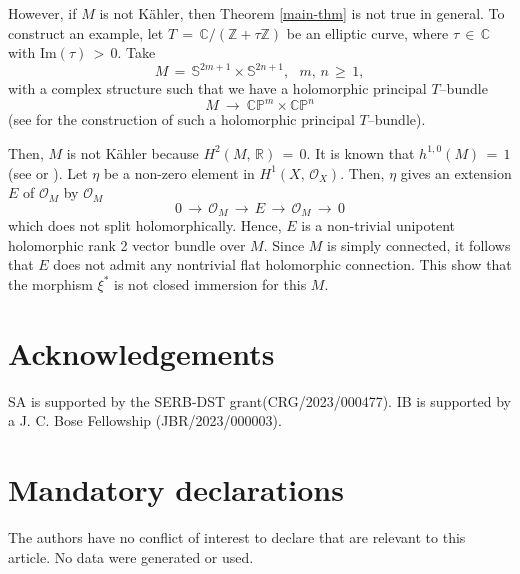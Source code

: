 \documentclass[12pt]{amsart}
\theoremstyle{definition}
\numberwithin{equation}{section}
\newcommand{\C}{\mathbb{C}}
\newcommand{\Z}{\mathbb{Z}}
\begin{document}
However, if $M$ is not K\"ahler, then Theorem \ref{main-thm} is not true in general. 
To construct an example, let $T \,=\, \C/(\Z + \tau\Z)$ be an elliptic curve,
where $\tau\,\in\,  \C$ with $\mathrm{Im}(\tau) \,>\, 0$. Take
$$M\, =\, \mathbb{S}^{2m+1}\times \mathbb{S}^{2n+1},\ \ \ m,\, n\, \geq\, 1,$$
with a complex structure such that we have a 
holomorphic principal $T$--bundle
$$M\ \longrightarrow\ \C\mathbb{P}^m \times \C\mathbb{P}^n$$
(see \cite{Ho} for the construction of such a holomorphic principal $T$--bundle).

Then, $M$ is not K\"ahler because $H^2(M,\, {\mathbb R})\,=\, 0$.
It is known that $h^{1, 0}(M) \,=\, 1$ (see \cite[p.~232]{Ho} or \cite{Bo}).
Let $\eta$ be a non-zero element in $H^1(X,\, \mathcal{O}_X)$. Then, $\eta$ gives an 
extension $E$ of ${\mathcal O}_M$ by ${\mathcal O}_M$
$$
0\,\longrightarrow\, \mathcal{O}_M \,\longrightarrow\, E \,\longrightarrow\, \mathcal{O}_M
\,\longrightarrow\, 0
$$
which does not split holomorphically.
Hence, $E$ is a non-trivial unipotent holomorphic rank 2 vector bundle over $M$.
Since $M$ is simply connected, it follows that $E$ does not admit any
nontrivial flat holomorphic connection. This show that the morphism $\xi^*$
is not closed immersion for this $M$.
 
\section*{Acknowledgements}
SA is supported by the SERB-DST grant(CRG/2023/000477). IB is supported by a J. C. Bose 
Fellowship (JBR/2023/000003).

\section*{Mandatory declarations}

The authors have no conflict of interest to declare that are relevant to this article.
No data were generated or used.
\end{document}
